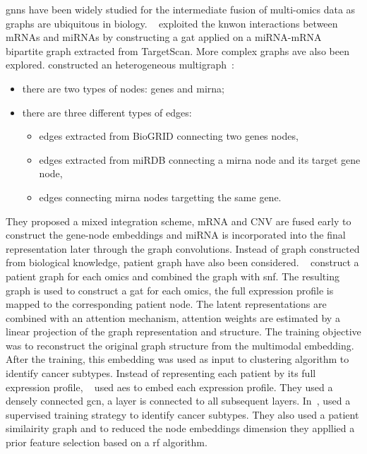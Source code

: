 \documentclass[../main.tex]{subfiles}
\begin{document}
		\Glspl{gnn} have been widely studied for the intermediate fusion of multi-omics data as graphs are ubiquitous in biology.
		\citeauthor{Kaczmarek2021}~\cite{Kaczmarek2021} exploited the knwon interactions between mRNAs and miRNAs by constructing a \gls{gat} applied on a miRNA-mRNA bipartite graph extracted from TargetScan.
		More complex graphs ave also been explored.
		\citeauthor{Li2024} constructed an heterogeneous multigraph~\cite{Li2024}:
		\begin{itemize}[nosep]
			\item there are two types of nodes: genes and \gls{mirna};
			\item there are three different types of edges:
				\begin{itemize}[nosep]
					\item edges extracted from BioGRID\cite{biogrid} connecting two genes nodes,
					\item edges extracted from miRDB\cite{mirdb} connecting a \gls{mirna} node and its target gene node,
					\item edges connecting \gls{mirna} nodes targetting the same gene.
				\end{itemize}
		\end{itemize}
		They proposed a mixed integration scheme, mRNA and CNV are fused early to construct the gene-node embeddings and miRNA is incorporated into the final representation later through the graph convolutions.
		Instead of graph constructed from biological knowledge, patient graph have also been considered.
		\citeauthor{MultiGATAE}~\cite{MultiGATAE} construct a patient graph for each omics and combined the graph with \gls{snf}.
		The resulting graph is used to construct a \gls{gat} for each omics, the full expression profile is mapped to the corresponding patient node.
		The latent representations are combined with an attention mechanism, attention weights are estimated by a linear projection of the graph representation and structure.
		The training objective was to reconstruct the original graph structure from the multimodal embedding.
		After the training, this embedding was used as input to clustering algorithm to identify cancer subtypes.
		Instead of representing each patient by its full expression profile, \citeauthor{Zhang2022}~\cite{Zhang2022} used \glspl{ae} to embed each expression profile.
		They used a densely connected \gls{gcn}, a layer is connected to all subsequent layers.
		In~\cite{Kesimoglu2022}, \citeauthor{Kesimoglu2022} used a supervised training strategy to identify cancer subtypes.
		They also used a patient similairity graph and to reduced the node embeddings dimension they appllied a prior feature selection based on a \gls{rf} algorithm.
\end{document}
